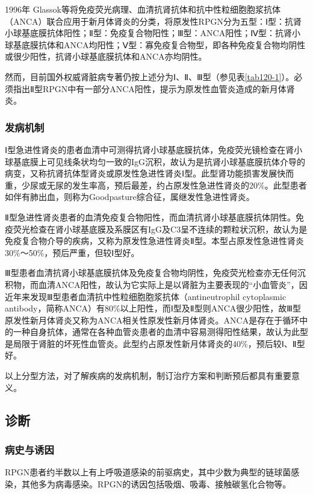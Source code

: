 1996年
Glassok等将免疫荧光病理、血清抗肾抗体和抗中性粒细胞胞浆抗体（ANCA）联合应用于新月体肾炎的分类，将原发性RPGN分为五型：Ⅰ型：抗肾小球基底膜抗体阳性；Ⅱ型：免疫复合物阳性；Ⅲ型：ANCA阳性；Ⅳ型：抗肾小球基底膜抗体和ANCA均阳性；Ⅴ型：寡免疫复合物型，即各种免疫复合物均阴性或很少阳性，抗肾小球基底膜抗体和ANCA亦均阴性。

然而，目前国外权威肾脏病专著仍按上述分为Ⅰ、Ⅱ、Ⅲ型（参见表\ref{tab120-1}）。必须指出Ⅱ型RPGN中有一部分ANCA阳性，提示为原发性血管炎造成的新月体肾炎。

\subsubsection{发病机制}

Ⅰ型急进性肾炎的患者血清中可测得抗肾小球基底膜抗体，免疫荧光镜检查在肾小球基底膜上可见线条状均匀一致的IgG沉积，故认为是抗肾小球基底膜抗体介导的病变，又称抗肾抗体型肾炎或原发性急进性肾炎Ⅰ型。此型肾功能损害发展快而重，少尿或无尿的发生率高，预后最差，约占原发性急进性肾炎的20\%。此型患者如伴有肺出血，则称为Goodpasture综合征，属继发性急进性肾炎。

Ⅱ型急进性肾炎患者的血清免疫复合物阳性，而血清抗肾小球基底膜抗体阴性。免疫荧光检查在肾小球基底膜及系膜区有IgG及C3呈不连续的颗粒状沉积，故认为是免疫复合物介导的疾病，又称为原发性急进性肾炎Ⅱ型。本型占原发性急进性肾炎30\%～50\%，预后严重，但较Ⅰ型好。

Ⅲ型患者血清抗肾小球基底膜抗体及免疫复合物均阴性，免疫荧光检查亦无任何沉积物，而血清ANCA阳性，故认为它实际上是以肾脏为主要表现的“小血管炎”，因近年来发现Ⅲ型患者血清抗中性粒细胞胞浆抗体（antineutrophil
cytoplasmic
antibody，简称ANCA）有80\%以上阳性，而Ⅰ型及Ⅱ型则ANCA很少阳性，故Ⅲ型原发性新月体肾炎又称为ANCA相关性原发性新月体肾炎。ANCA是存在于循环中的一种自身抗体，通常在各种血管炎患者的血清中容易测得阳性结果，故认为此型是局限于肾脏的坏死性血管炎。此型约占原发性新月体肾炎的40\%，预后较Ⅰ、Ⅱ型好。

以上分型方法，对了解疾病的发病机制，制订治疗方案和判断预后都具有重要意义。

\subsection{诊断}

\subsubsection{病史与诱因}

RPGN患者约半数以上有上呼吸道感染的前驱病史，其中少数为典型的链球菌感染，其他多为病毒感染。RPGN的诱因包括吸烟、吸毒、接触碳氢化合物等。

